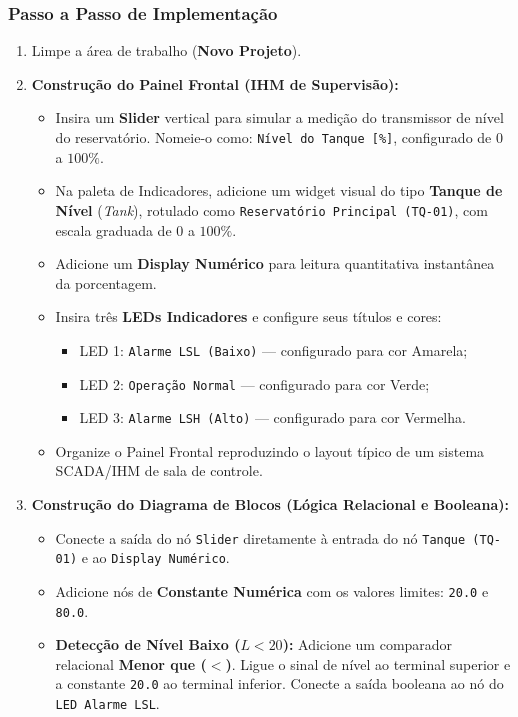 \documentclass[11pt,a4paper]{article}
\begin{document}
\subsubsection{Passo a Passo de Implementação}
\begin{enumerate}
    \item Limpe a área de trabalho (\textbf{Novo Projeto}).
    \item \textbf{Construção do Painel Frontal (IHM de Supervisão):}
    \begin{itemize}
        \item Insira um \textbf{Slider} vertical para simular a medição do transmissor de nível do reservatório. Nomeie-o como: \texttt{Nível do Tanque [\%]}, configurado de $0$ a $100\%$.
        \item Na paleta de Indicadores, adicione um widget visual do tipo \textbf{Tanque de Nível} (\textit{Tank}), rotulado como \texttt{Reservatório Principal (TQ-01)}, com escala graduada de $0$ a $100\%$.
        \item Adicione um \textbf{Display Numérico} para leitura quantitativa instantânea da porcentagem.
        \item Insira três \textbf{LEDs Indicadores} e configure seus títulos e cores:
        \begin{itemize}
            \item LED 1: \texttt{Alarme LSL (Baixo)} --- configurado para cor Amarela;
            \item LED 2: \texttt{Operação Normal} --- configurado para cor Verde;
            \item LED 3: \texttt{Alarme LSH (Alto)} --- configurado para cor Vermelha.
        \end{itemize}
        \item Organize o Painel Frontal reproduzindo o layout típico de um sistema SCADA/IHM de sala de controle.
    \end{itemize}
    \item \textbf{Construção do Diagrama de Blocos (Lógica Relacional e Booleana):}
    \begin{itemize}
        \item Conecte a saída do nó \texttt{Slider} diretamente à entrada do nó \texttt{Tanque (TQ-01)} e ao \texttt{Display Numérico}.
        \item Adicione nós de \textbf{Constante Numérica} com os valores limites: \texttt{20.0} e \texttt{80.0}.
        \item \textbf{Detecção de Nível Baixo ($L < 20$):} Adicione um comparador relacional \textbf{Menor que ($<$)}. Ligue o sinal de nível ao terminal superior e a constante \texttt{20.0} ao terminal inferior. Conecte a saída booleana ao nó do \texttt{LED Alarme LSL}.

\end{itemize}
\end{enumerate}
\end{document}
